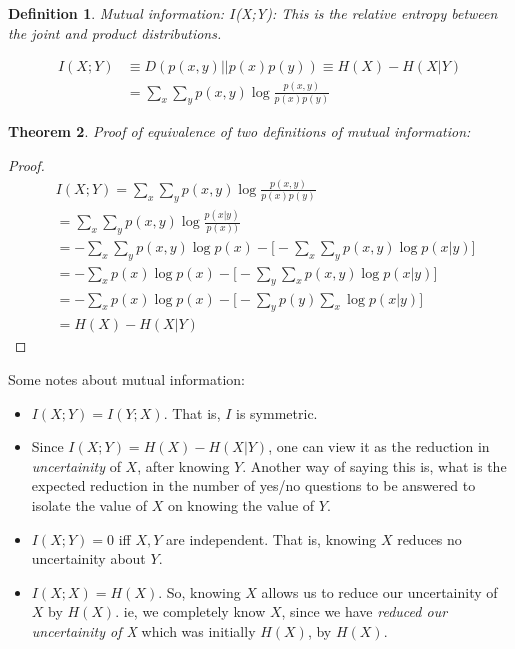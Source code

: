 \documentclass[11pt]{book}
\newtheorem{theorem}{Theorem}
\newtheorem{definition}[theorem]{Definition}
\renewcommand{\H}{\ensuremath{H}}
\newcommand{\KL}[2]{\ensuremath{D(#1 || #2)}}
\newcommand{\I}{\ensuremath{I}}
\begin{document}
\begin{definition}
    Mutual information: \I(X;Y): This is the relative entropy between the
    joint and product distributions.

    \begin{align*}
        \I(X;Y) &\equiv \KL{p(x, y)}{p(x)p(y)} \equiv H(X) - H(X|Y) \\
                &= \sum_x \sum_y p(x, y) \log \frac{p(x, y)}{p(x)p(y)}
    \end{align*}
    
\end{definition}

\begin{theorem}
    Proof of equivalence of two definitions of mutual information:
\end{theorem}
\begin{proof}
    \begin{align*}
        &\I(X;Y)  = \sum_x \sum_y p(x, y) \log \frac{p(x, y)}{p(x)p(y)} \\
        &= \sum_x \sum_y p(x, y) \log \frac{p(x|y)}{p(x))} \\
        &= - \sum_x \sum_y p(x, y) \log p(x) - \big[ - \sum_x \sum_y p(x, y) \log p(x|y) \big] \\
        &= - \sum_x p(x) \log p(x) - \big[ - \sum_y \sum_x p(x, y) \log p(x|y) \big] \\
        &= - \sum_x p(x) \log p(x) - \big[ - \sum_y p(y) \sum_x \log p(x|y) \big] \\
        &= \H(X) - H(X|Y)
    \end{align*}
\end{proof}


Some notes about mutual information:
\begin{itemize}
    \item $I(X; Y) = I(Y;X)$. That is, $I$ is symmetric.

    \item Since $I(X;Y) = H(X) - H(X|Y)$, one can view it as the reduction
        in \textit{uncertainity} of $X$, after knowing $Y$. Another way of
        saying this is, what is the expected reduction in the number of
        yes/no questions to be answered to isolate the value of $X$ on knowing
        the value of $Y$.

    \item $I(X;Y) = 0$ iff $X, Y$ are independent. That is, knowing $X$ reduces
        no uncertainity about $Y$.

    \item $I(X;X) = H(X)$. So, knowing $X$ allows us to reduce our uncertainity
        of $X$ by $H(X)$. ie, we completely know $X$, since we have
        \textit{reduced our uncertainity of X} which was initially $H(X)$, by $H(X)$.

\end{itemize}
\end{document}
